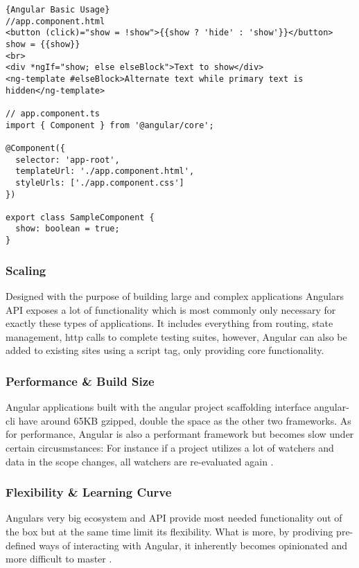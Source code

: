 \begin{lstlisting}[caption=Angular Basic Usage Example, captionpos=b, style=htmlcssjs]{Angular Basic Usage}
//app.component.html
<button (click)="show = !show">{{show ? 'hide' : 'show'}}</button> show = {{show}}
<br>
<div *ngIf="show; else elseBlock">Text to show</div>
<ng-template #elseBlock>Alternate text while primary text is hidden</ng-template>

// app.component.ts
import { Component } from '@angular/core';

@Component({
  selector: 'app-root',
  templateUrl: './app.component.html',
  styleUrls: ['./app.component.css']
})

export class SampleComponent {
  show: boolean = true;
}
\end{lstlisting}

\subsubsection{Scaling}
Designed with the purpose of building large and complex applications Angulars API exposes a lot of functionality which is most commonly only necessary for exactly these types of applications. It includes everything from routing, state management, http calls to complete testing suites, however, Angular can also be added to existing sites using a script tag, only providing core functionality.

\subsubsection{Performance \& Build Size}
Angular applications built with the angular project scaffolding interface angular-cli have around 65KB gzipped, double the space as the other two frameworks. As for performance, Angular is also a performant framework \cite{FrameworksPerformance:online} but becomes slow under certain circusmstances: For instance if a project utilizes a lot of watchers and data in the scope changes, all watchers are re-evaluated again \cite{ComparisonVue:online}.

\subsubsection{Flexibility \& Learning Curve}
 Angulars very big ecosystem and API provide most needed functionality out of the box but at the same time limit its flexibility. What is more, by prodiving pre-defined ways of interacting with Angular, it inherently becomes opinionated and more difficult to master \cite{ComparisonVue:online}.


